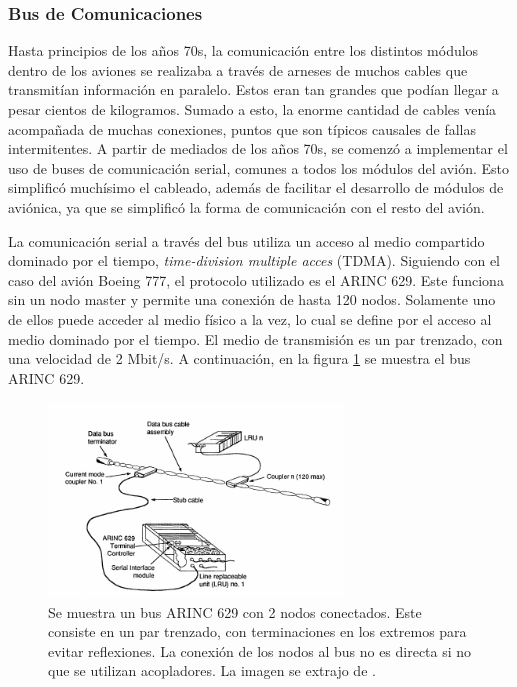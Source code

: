 \subsubsection{Bus de Comunicaciones}

Hasta principios de los años 70s, la comunicación entre los distintos módulos dentro de los aviones se realizaba a través de arneses de muchos cables que transmitían información en paralelo. Estos eran tan grandes que podían llegar a pesar cientos de kilogramos. Sumado a esto, la enorme cantidad de cables venía acompañada de muchas conexiones, puntos que son típicos causales de fallas intermitentes. A partir de mediados de los años 70s, se comenzó a implementar el uso de buses de comunicación serial, comunes a todos los módulos del avión. Esto simplificó muchísimo el cableado, además de facilitar el desarrollo de módulos de aviónica, ya que se simplificó la forma de comunicación con el resto del avión.

La comunicación serial a través del bus utiliza un acceso al medio compartido dominado por el tiempo, \textit{time-division multiple acces} (TDMA). Siguiendo con el caso del avión Boeing 777, el protocolo utilizado es el ARINC 629. Este funciona sin un nodo master y permite una conexión de hasta 120 nodos. Solamente uno de ellos puede acceder al medio físico a la vez, lo cual se define por el acceso al medio dominado por el tiempo. El medio de transmisión es un par trenzado, con una velocidad de 2 Mbit/s. A continuación, en la figura \ref{fig:ARINC_629_bus} se muestra el bus ARINC 629.

\begin{figure}[H]
    \centering
    \includegraphics[width=0.7\textwidth]{img/ARINC_629_bus.png}
    \caption{Se muestra un bus ARINC 629 con 2 nodos conectados. Este consiste en un par trenzado, con terminaciones en los extremos para evitar reflexiones. La conexión de los nodos al bus no es directa si no que se utilizan acopladores. La imagen se extrajo de \cite{yeh1996triple}.}
    \label{fig:ARINC_629_bus}    
\end{figure}

